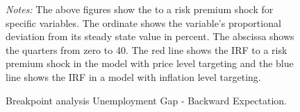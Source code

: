 \documentclass[11pt, a4paper, leqno]{article}
\begin{document}
\begin{figure}[ht!]
	\caption{Breakpoint analysis Unemployment Gap - Backward Expectation.}
	\centering
    	\bigskip
	\begin{minipage}{\textwidth}%
		\footnotesize\setlength{\baselineskip}{11pt}%
		\bigskip \textit{Notes:} The above figures show the  to a risk premium shock for specific variables. The ordinate shows the variable's proportional deviation from its steady state value in percent. The abscissa shows the quarters from zero to 40. The red line shows the IRF to a risk premium shock in the model with price level targeting and the blue line shows the IRF in a model with inflation level targeting.
	\end{minipage}
\end{figure}
\end{document}
